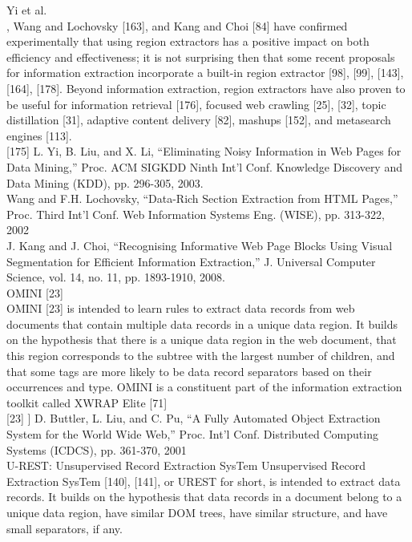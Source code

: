 Yi et al.\\
[175], Wang and Lochovsky [163], and Kang and Choi [84]
have confirmed experimentally that using region extractors
has a positive impact on both efficiency and effectiveness; it
is not surprising then that some recent proposals for
information extraction incorporate a built-in region extractor
[98], [99], [143], [164], [178]. Beyond information
extraction, region extractors have also proven to be useful
for information retrieval [176], focused web crawling [25],
[32], topic distillation [31], adaptive content delivery [82],
mashups [152], and metasearch engines [113].\\

[175] L. Yi, B. Liu, and X. Li, “Eliminating Noisy Information in Web
Pages for Data Mining,” Proc. ACM SIGKDD Ninth Int’l Conf.
Knowledge Discovery and Data Mining (KDD), pp. 296-305, 2003. \\
[163] Wang and F.H. Lochovsky, “Data-Rich Section Extraction from
HTML Pages,” Proc. Third Int’l Conf. Web Information Systems Eng.
(WISE), pp. 313-322, 2002\\
[84] J. Kang and J. Choi, “Recognising Informative Web Page Blocks
Using Visual Segmentation for Efficient Information Extraction,”
J. Universal Computer Science, vol. 14, no. 11, pp. 1893-1910, 2008.\\

OMINI [23] \\
OMINI [23] is intended to learn rules to extract data records
from web documents that contain multiple data records in a
unique data region. It builds on the hypothesis that there is
a unique data region in the web document, that this region
corresponds to the subtree with the largest number of
children, and that some tags are more likely to be data
record separators based on their occurrences and type.
OMINI is a constituent part of the information extraction
toolkit called XWRAP Elite [71]\\

[23] ] D. Buttler, L. Liu, and C. Pu, “A Fully Automated Object
Extraction System for the World Wide Web,” Proc. Int’l Conf.
Distributed Computing Systems (ICDCS), pp. 361-370, 2001\\

U-REST: Unsupervised Record Extraction
SysTem
Unsupervised Record Extraction SysTem [140], [141], or UREST
for short, is intended to extract data records. It builds
on the hypothesis that data records in a document belong to
a unique data region, have similar DOM trees, have similar
structure, and have small separators, if any.\\

